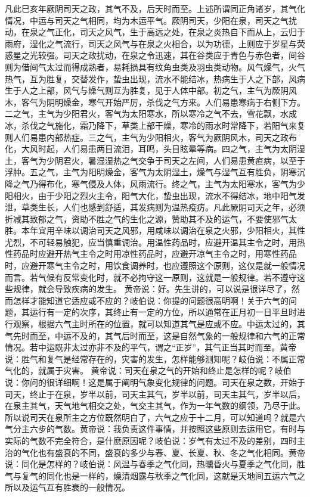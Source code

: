\documentclass[12pt,UTF8]{ctexbook}
\begin{document}
凡此巳亥年厥阴司天之政，其气不及，后天时而至。上述所谓同正角诸岁，其气化情况，中运与司天之气相同，均为木运平气。厥阴司天，少阳在泉，司天之气扰动，在泉之气正化，司天之风气，生于高远之处，在泉之炎热自下而从上，云归于雨府，湿化之气流行，司天之风气与在泉之火相合，以为功德，上则应于岁星与荧惑星之光较强。司天之政扰动，在泉之令迅速，其在谷类应于青色与赤色者，间谷则为借间气太过而得成熟者，易耗损具有纹角虫类及羽虫类动物。风气燥气，火气热气，互为胜复，交替发作，蛰虫出现，流水不能结冰，热病生于人之下部，风病生于人之上部，风气与燥气则互为胜复，见于人体中部。初之气，主气为厥阴风木，客气为阴明燥金，寒气开始严厉，杀伐之气方来。人们易患寒病于右侧下方。二之气，主气为少阳君火，客气为太阳寒水，所以寒冷之气不去，雪花飘，水成冰，杀伐之气施化，霜乃降下，草类上部干燥，寒冷的雨水时常降下，若阳气来复则人们易患内部热症。三之气，主气为少阳相火，客气为厥阴风木，司天之政布化，大风时起，人们易患两目流泪，耳鸣，头目眩晕等病。四之气，主气为太阴湿土，客气为少阴君火，暑湿湿热之气交争于司天之左间，人们易患黄疸病，以至于浮肿。五之气，主气为阳明燥金，客气为太阴湿土，燥气与湿气互有胜负，阴寒沉降之气乃得布化，寒气侵及人体，风雨流行。终之气，主气为太阳寒水，客气为少阳相火，由于少阳之烈火主令，阳气大化，蛰虫出现，流水不得结冰，地中阳气发泄，草类生长，人们也感到舒适，其发病则为温热疫疠。凡此厥阴司天之年，必须折减其致郁之气，资助不胜之气的生化之源，赞助其不及的运气，不要使邪气太胜。本年宜用辛味以调治司天之风邪，用咸味以调治在泉之火邪，少阳相火，其性尤烈，不可轻易触犯，应当慎重调治。用温性药品时，应避开温其主令之时，用热性药品时应避开热气主令之时用凉性药品时，应避开凉气主令之时，用寒性药品时，应避开寒气主令之时，用饮食调养时，也应遵照这个原则，这仅是就一般情况而言。若气候有反常变化时，就不必拘守这一原则，这就是一般规律。若不遵守这些规律，就会导致疾病的发生。
黄帝说：好。先生讲的，可以说是很详尽了，然而怎样才能知道它适应或不应的？岐伯说：你提的问题很高明啊！关于六气的问题，其运行有一定的次序，其终止有一定的方位，所以通常在正月初一日平旦时进行观察，根据六气主时所在的位置，就可以知道其气是应或不应。中运太过的，其气先时而至，中运不及的，其气后时而至，这是自然气象的一般规律和六气的正常情况。若中运既非太过亦非不及的平气，谓之“正岁”，其气正当其时而至。黄帝说：胜气和复气是经常存在的，灾害的发生，怎样能够测知呢？岐伯说：不属正常气化的，就属于灾害。
黄帝说：司天在泉之气的开始和终止是怎样的呢？岐伯说：你问的很详细啊！这是属于阐明气象变化规律的问题。司天在泉之数，开始于司天，终止于在泉，岁半以前，司天主其气，岁半以前，司天主其气，岁半以后，在泉主其气，天气地气相交之处，气交主其气，作为一年气数的纲领，乃尽于此。所以说司天在泉所主之方位既然明白了，六气之应于十二月，可以知道吗？就是六气分主六步的气数。黄帝说：我负责这件事情，并按照这些原则去运用它，有时与实际的气数不完全符合，是什麽原因呢？岐伯说：岁气有太过不及的差别，四时主治的气化也有盛衰的不同，盛衰的多少与春、夏、长夏、秋、冬之气化相同。黄帝说：同化是怎样的？岐伯说：风温与春季之气化同，热曛昏火与夏季之气化同，胜气与复气的同化也是一样的，燥清烟露与秋季之气化同，这就是天地间五运六气之所以及运气互有胜衰的一般情况。
\end{document}

